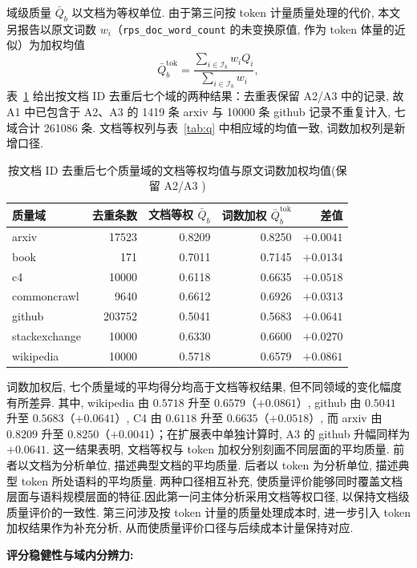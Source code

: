 域级质量 $\bar Q_b$ 以文档为等权单位. 由于第三问按 token 计量质量处理的代价, 本文另报告以原文词数 $w_i$（\texttt{rps\_doc\_word\_count} 的未变换原值, 作为 token 体量的近似）为加权均值
\[\bar Q_b^{\mathrm{tok}}=\frac{\sum_{i\in\mathcal I_b}w_iQ_i}{\sum_{i\in\mathcal I_b}w_i}, \]
表~\ref{tab:qtok} 给出按文档 ID 去重后七个域的两种结果：去重表保留 A2/A3 中的记录, 故 A1 中已包含于 A2、A3 的 1419 条 arxiv 与 10000 条 github 记录不重复计入, 七域合计 261086 条. 文档等权列与表~\ref{tab:q} 中相应域的均值一致, 词数加权列是新增口径. 

\begin{table}[H]\centering\small
\caption{按文档 ID 去重后七个质量域的文档等权均值与原文词数加权均值(保留 A2/A3 )}\label{tab:qtok}
\begin{tabular}{lrrrr}\toprule
质量域 & 去重条数 & 文档等权 $\bar Q_b$ & 词数加权 $\bar Q_b^{\mathrm{tok}}$ & 差值\\\midrule
arxiv & 17523 & 0.8209 & 0.8250 & $+0.0041$\\
book & 171 & 0.7011 & 0.7145 & $+0.0134$\\
c4 & 10000 & 0.6118 & 0.6635 & $+0.0518$\\
commoncrawl & 9640 & 0.6612 & 0.6926 & $+0.0313$\\
github & 203752 & 0.5041 & 0.5683 & $+0.0641$\\
stackexchange & 10000 & 0.6330 & 0.6600 & $+0.0270$\\
wikipedia & 10000 & 0.5718 & 0.6579 & $+0.0861$\\\bottomrule
\end{tabular}
\end{table}

词数加权后,  七个质量域的平均得分均高于文档等权结果,  但不同领域的变化幅度有所差异. 其中,  wikipedia 由 $0.5718$ 升至 $0.6579$（$+0.0861$）,  github 由 $0.5041$ 升至 $0.5683$（$+0.0641$）,  C4 由 $0.6118$ 升至 $0.6635$（$+0.0518$）,  而 arxiv 由 $0.8209$ 升至 $0.8250$（$+0.0041$）；在扩展表中单独计算时,  A3 的 github 升幅同样为 $+0.0641$. 这一结果表明,  文档等权与 token 加权分别刻画不同层面的平均质量. 前者以文档为分析单位,  描述典型文档的平均质量. 后者以 token 为分析单位,  描述典型 token 所处语料的平均质量. 两种口径相互补充,  使质量评价能够同时覆盖文档层面与语料规模层面的特征.因此第一问主体分析采用文档等权口径,  以保持文档级质量评价的一致性. 第三问涉及按 token 计量的质量处理成本时,  进一步引入 token 加权结果作为补充分析,  从而使质量评价口径与后续成本计量保持对应.



\textbf{评分稳健性与域内分辨力:}


